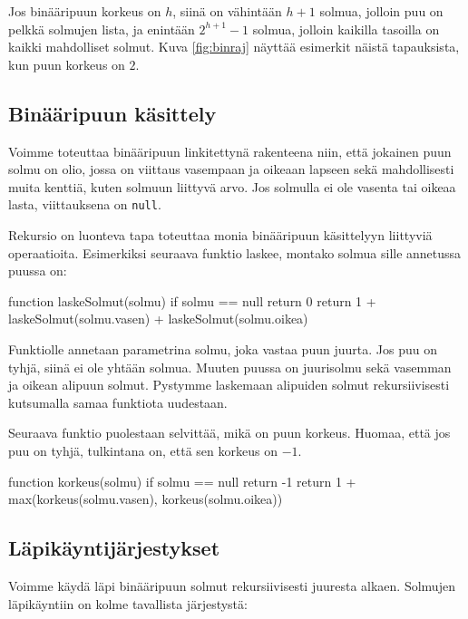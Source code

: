 Jos binääripuun korkeus on $h$, siinä on vähintään $h+1$ solmua,
jolloin puu on pelkkä solmujen lista,
ja enintään $2^{h+1}-1$ solmua,
jolloin kaikilla tasoilla on kaikki mahdolliset solmut.
Kuva \ref{fig:binraj} näyttää esimerkit näistä tapauksista,
kun puun korkeus on $2$.

\subsection{Binääripuun käsittely}

Voimme toteuttaa binääripuun linkitettynä rakenteena niin,
että jokainen puun solmu on olio, jossa on viittaus
vasempaan ja oikeaan lapseen sekä mahdollisesti
muita kenttiä, kuten solmuun liittyvä arvo.
Jos solmulla ei ole vasenta tai oikeaa lasta,
viittauksena on \texttt{null}.

Rekursio on luonteva tapa toteuttaa monia
binääripuun käsittelyyn liittyviä operaatioita.
Esimerkiksi seuraava funktio laskee, montako solmua
sille annetussa puussa on:

\begin{code}
function laskeSolmut(solmu)
    if solmu == null
        return 0
    return 1 + laskeSolmut(solmu.vasen) +
                laskeSolmut(solmu.oikea)
\end{code}

Funktiolle annetaan parametrina solmu,
joka vastaa puun juurta.
Jos puu on tyhjä, siinä ei ole yhtään solmua.
Muuten puussa on juurisolmu sekä vasemman
ja oikean alipuun solmut.
Pystymme laskemaan alipuiden solmut rekursiivisesti
kutsumalla samaa funktiota uudestaan.

Seuraava funktio puolestaan selvittää, mikä on puun korkeus.
Huomaa, että jos puu on tyhjä, tulkintana on,
että sen korkeus on $-1$.

\begin{code}
function korkeus(solmu)
    if solmu == null
        return -1
    return 1 + max(korkeus(solmu.vasen), korkeus(solmu.oikea))
\end{code}

\subsection{Läpikäyntijärjestykset}

Voimme käydä läpi binääripuun solmut rekursiivisesti
juuresta alkaen.
Solmujen läpikäyntiin on kolme tavallista järjestystä:



